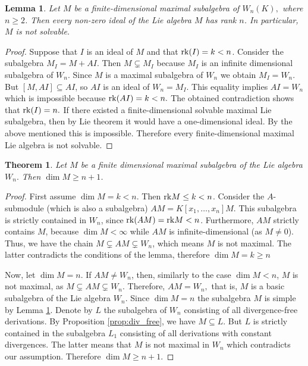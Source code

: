 \documentclass[12pt,a4paper]{amsart}
\theoremstyle{plain}
\newtheorem{theorem}{Theorem}
\newtheorem{lemma}{Lemma}
\theoremstyle{definition}
\begin{document}
{	\begin{lemma} \label{lm:max}
		Let $M$ be a finite-dimensional maximal subalgebra of $W_n(K),$ where $ n\geq 2$.
		Then every  non-zero ideal of the Lie algebra $M$ has rank $n$.
		In particular, $M$ is not  solvable.
	\end{lemma}
	\begin{proof}
		Suppose  that $I$ is an ideal of $M$ and  that ${\rm rk}(I)=k < n$. 
		Consider the subalgebra $M_I = M+AI$. Then 
		$M \subsetneq M_I$ because $M_I $ is an infinite dimensional subalgebra of $W_n.$  Since $M$ is a maximal subalgebra of $W_n$ we obtain $M_I=W_n.$ But $[M,  AI]\subseteq AI$, so $AI$ is an ideal of $W_n=M_I.$ This equality implies $AI=W_n$ which is impossible because ${\rm rk}(AI)=k<n.$ The obtained contradiction shows that ${\rm rk}(I)=n.$
		If there existed a finite-dimensional solvable maximal Lie subalgebra, then by Lie theorem it would have a one-dimensional ideal. 	By  the above mentioned this is impossible. Therefore every finite-dimensional maximal Lie algebra is not solvable.
	\end{proof}
	\begin{theorem}\label{th3}
		Let $M$ be a  finite dimensional maximal subalgebra of the Lie algebra $W_n.$ Then  $\dim M \geq n+1$. 
	\end{theorem}
	\begin{proof}
		First assume $\dim M = k < n$. Then ${\rm rk}M \le k < n$. Consider the $A$-submodule (which is also a subalgebra) $ AM=K[x_1, \dots, x_n]M$. This subalgebra is strictly contained in $W_n$, since ${\rm rk}(AM) = {\rm rk}M < n$. Furthermore, $AM$ strictly contains $M$, because $\dim M < \infty$ while $AM$ is infinite-dimensional (as $M \ne 0$). Thus, we have the chain $M \subsetneq AM \subsetneq W_n$, which means $M$ is not maximal. The latter contradicts the conditions of the lemma, therefore $\dim M = k \geq  n$
		
		Now, let $\dim M = n$. If $AM \ne W_n$, then, similarly to the case $\dim M < n$, $M$ is not maximal, as $M \subsetneq AM \subsetneq W_n$.
		Therefore,   $AM= W_n, $ that is,     $M$ is a basic subalgebra of the Lie algebra $W_n.$
		Since $\dim M = n$ the subalgebra $M$ is simple by Lemma \ref{lm:max}.
		Denote by $L$ the subalgebra of $W_n$ consisting of all divergence-free derivations. By  Proposition \ref{prop:div_free}, we have $M\subseteq L.$ But $L$ is strictly contained in the subalgebra $L_1$ consisting of all derivations with constant divergences. The latter means that $M$ is not maximal in $W_n$ which contradicts our assumption. Therefore $\dim M\geq n+1.$ 
		

\end{proof}}
\end{document}
